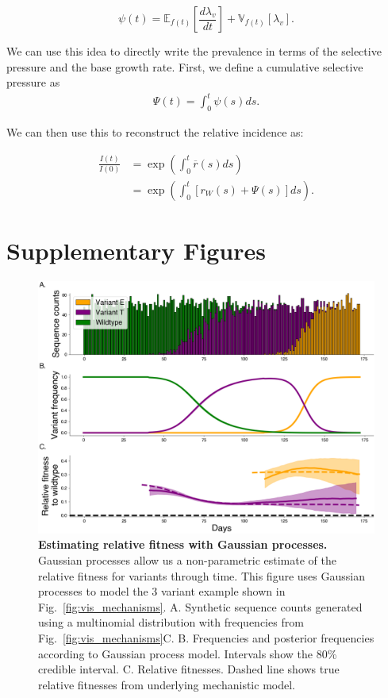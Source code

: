 \documentclass[11pt,oneside,letterpaper]{article}
\newcommand{\Expect}{\mathbb{E}}
\newcommand{\Var}{\mathbb{V}}
\newcommand{\wt}{W}
\begin{document}
\begin{equation}
\psi(t) =  \Expect_{f(t)}\left[ \frac{d \lambda_v}{d t}\right] +  \Var_{f(t)}[\lambda_{v}].
\end{equation}

We can use this idea to directly write the prevalence in terms of the selective pressure and the base growth rate.
First, we define a cumulative selective pressure as
\begin{align*}
\Psi(t) = \int_{0}^{t} \psi(s) ds.
\end{align*}

We can then use this to reconstruct the relative incidence as:

\begin{align*}
    \frac{I(t)}{I(0)} &= \exp\left(\int_{0}^{t} \overline{r}(s) ds\right)\\
         &= \exp \left(\int_{0}^{t} [r_{\wt}(s) + \Psi(s)]ds \right).
\end{align*}

\newpage

\section*{Supplementary Figures}

\begin{figure}[h]
    \centering
    \includegraphics[width=1.0\linewidth]{./supplementary_figures/gp_example.png}
    \caption{
    \textbf{Estimating relative fitness with Gaussian processes.}
      Gaussian processes allow us a non-parametric estimate of the relative fitness for variants through time.
      This figure uses Gaussian processes to model the 3 variant example shown in Fig.~\ref{fig:vis_mechanisms}.
      A. Synthetic sequence counts generated using a multinomial distribution with frequencies from Fig.~\ref{fig:vis_mechanisms}C.
      B. Frequencies and posterior frequencies according to Gaussian process model. Intervals show the 80\% credible interval.
      C. Relative fitnesses. Dashed line shows true relative fitnesses from underlying mechanistic model.
    }
    \label{fig:gp_example}
\end{figure}
\end{document}
